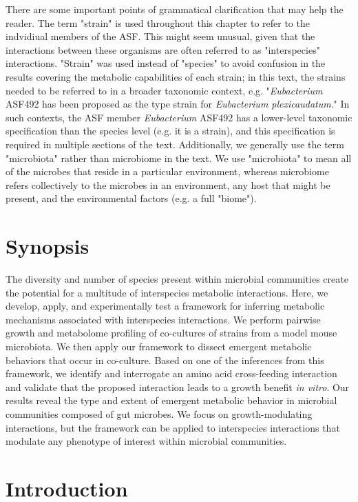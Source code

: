 \documentclass[11pt,twocolumn,notitlepage,openany,twoside]{book}
\begin{document}
\begin{refsection}
There are some important points of grammatical clarification that may help the reader. The term "strain" is used throughout this chapter to refer to the indvidiual members of the ASF. This might seem unusual, given that the interactions between these organisms are often referred to as "interspecies" interactions. "Strain" was used instead of "species" to avoid confusion in the results covering the metabolic capabilities of each strain; in this text, the strains needed to be referred to in a broader taxonomic context, e.g. "\textit{Eubacterium} ASF492 has been proposed as the type strain for \textit{Eubacterium plexicaudatum}." In such contexts, the ASF member \textit{Eubacterium} ASF492 has a lower-level taxonomic specification than the species level (e.g. it is a strain), and this specification is required in multiple sections of the text. Additionally, we generally use the term "microbiota" rather than microbiome in the text. We use "microbiota" to mean all of the microbes that reside in a particular environment, whereas microbiome refers collectively to the microbes in an environment, any host that might be present, and the environmental factors (e.g. a full "biome").

\section{Synopsis}

The diversity and number of species present within microbial communities create the potential for a multitude of interspecies metabolic interactions. Here, we develop, apply, and experimentally test a framework for inferring metabolic mechanisms associated with interspecies interactions. We perform pairwise growth and metabolome profiling of co-cultures of strains from a model mouse microbiota. We then apply our framework to dissect emergent metabolic behaviors that occur in co-culture. Based on one of the inferences from this framework, we identify and interrogate an amino acid cross-feeding interaction and validate that the proposed interaction leads to a growth benefit \textit{in vitro}. Our results reveal the type and extent of emergent metabolic behavior in microbial communities composed of gut microbes. We focus on growth-modulating interactions, but the framework can be applied to interspecies interactions that modulate any phenotype of interest within microbial communities.

\section{Introduction}


\end{refsection}
\end{document}
